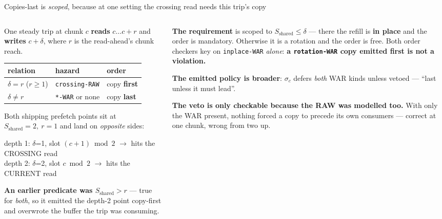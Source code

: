 \documentclass[aspectratio=169,9pt]{beamer}
\newcommand{\key}[1]{\textcolor{acc}{\textbf{#1}}}
\newcommand{\bad}[1]{\textcolor{warn}{\textbf{#1}}}
\newcommand{\good}[1]{\textcolor{ok}{\textbf{#1}}}
\begin{document}
\begin{frame}{Copies-last is \emph{scoped}, because at one setting the crossing read needs this trip's copy}

\begin{columns}[T]
\begin{column}{0.50\textwidth}
\vspace{-3pt}
One steady trip at chunk $c$ \key{reads} $c \ldots c{+}r$ and \key{writes} $c{+}\delta$, where $r$ is the read-ahead's chunk reach.

\vspace{3pt}
\small
\begin{tabular}{@{}lll@{}}
\toprule
relation & hazard & order \\
\midrule
$\delta = r$ ($r\ge1$) & \texttt{crossing-RAW} & copy \key{first} \\
$\delta \neq r$ & \texttt{*-WAR} or none & copy \key{last} \\
\bottomrule
\end{tabular}
\normalsize

\vspace{5pt}
Both shipping prefetch points sit at $S_{\text{shared}}{=}2,\ r{=}1$ and land on \emph{opposite} sides:
\begin{center}\ttfamily\scriptsize
depth 1: $\delta$=1, slot $(c{+}1)\bmod 2$ $\to$ hits the CROSSING read\\
depth 2: $\delta$=2, slot $c \bmod 2$ $\to$ hits the CURRENT read
\end{center}

\vspace{3pt}
{\scriptsize \bad{An earlier predicate was $S_{\text{shared}} > r$} --- true for \emph{both}, so it emitted the depth-2 point copy-first and overwrote the buffer the trip was consuming.}
\end{column}
\begin{column}{0.47\textwidth}
\vspace{-3pt}
\textbf{The requirement} is scoped to $S_{\text{shared}} \le \delta$ --- there the refill is \key{in place} and the order is mandatory. Otherwise it is a rotation and the order is free. Both order checkers key on \texttt{inplace-WAR} \emph{alone}: \good{a \texttt{rotation-WAR} copy emitted first is not a violation.}

\vspace{5pt}
\textbf{The emitted policy is broader}: $\sigma_c$ defers \emph{both} WAR kinds unless vetoed --- ``last unless it must lead''.

\vspace{5pt}
\bad{The veto is only checkable because the RAW was modelled too.} With only the WAR present, nothing forced a copy to precede its own consumers --- correct at one chunk, wrong from two up.
\end{column}
\end{columns}
\end{frame}
\end{document}
